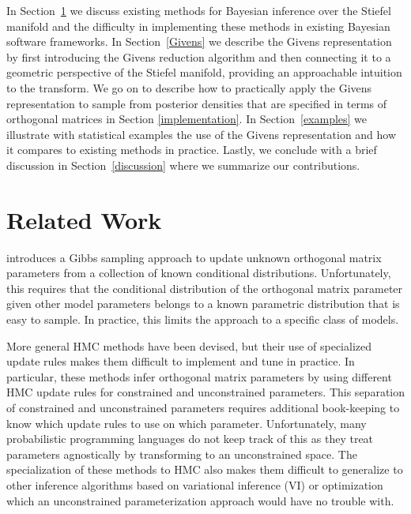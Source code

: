 \documentclass[ba]{imsart}
\numberwithin{equation}{section}
\theoremstyle{plain}
\begin{document}
\noindent In Section~\ref{related} we discuss existing methods for Bayesian inference over the Stiefel manifold and the difficulty in implementing these methods in existing Bayesian software frameworks. In Section~\ref{Givens} we describe the Givens representation by first introducing the Givens reduction algorithm and then connecting it to a geometric perspective of the Stiefel manifold, providing an approachable intuition to the transform. We go on to describe how to practically apply the Givens representation to sample from posterior densities that are specified in terms of orthogonal matrices in Section \ref{implementation}. In Section~\ref{examples} we illustrate with statistical examples the use of the Givens representation and how it compares to existing methods in practice. Lastly, we conclude with a brief discussion in Section~\ref{discussion} where we summarize our contributions.

\section{Related Work} \label{related}
\cite{hoff2009simulation} introduces a Gibbs sampling approach to update unknown orthogonal matrix parameters from a collection of known conditional distributions. Unfortunately, this requires that the conditional distribution of the orthogonal matrix parameter given other model parameters belongs to a known parametric distribution that is easy to sample. In practice, this limits the approach to a specific class of models.

\noindent More general HMC methods have been devised, but their use of specialized update rules makes them difficult to implement and tune in practice. In particular, these methods infer orthogonal matrix parameters by using different HMC update rules for constrained and unconstrained parameters. This separation of constrained and unconstrained parameters requires additional book-keeping to know which update rules to use on which parameter. Unfortunately, many probabilistic programming languages do not keep track of this as they treat parameters agnostically by transforming to an unconstrained space. The specialization of these methods to HMC also makes them difficult to generalize to other inference algorithms based on variational inference (VI) or optimization which an unconstrained parameterization approach would have no trouble with.
\end{document}
